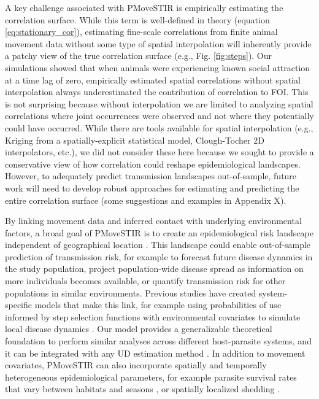 \documentclass[letterpaper]{article}
\begin{document}
A key challenge associated with PMoveSTIR is empirically estimating the correlation surface.  While this term is well-defined in theory (equation \ref{eq:stationary_cor}), estimating fine-scale correlations from finite animal movement data without some type of spatial interpolation will inherently provide a patchy view of the true correlation surface (e.g., Fig. \ref{fig:steps}).  Our simulations showed that when animals were experiencing known social attraction at a time lag of zero, empirically estimated spatial correlations without spatial interpolation always underestimated the contribution of correlation to FOI. This is not surprising because without interpolation we are limited to analyzing spatial correlations where joint occurrences were observed and not where they potentially could have occurred. While there are tools available for spatial interpolation (e.g., Kriging from a spatially-explicit statistical model, Clough-Tocher 2D interpolators, etc.), we did not consider these here because we sought to provide a conservative view of how correlation could reshape epidemiological landscapes.  However, to adequately predict transmission landscapes out-of-sample, future work will need to develop robust approaches for estimating and predicting the entire correlation surface (some suggestions and examples in Appendix X). 

By linking movement data and inferred contact with underlying environmental factors, a broad goal of PMoveSTIR is to create an epidemiological risk landscape independent of geographical location \citep{Manlove2022}. This landscape could enable out-of-sample prediction of transmission risk, for example to forecast future disease dynamics in the study population, project population-wide disease spread as information on more individuals becomes available, or quantify transmission risk for other populations in similar environments. Previous studies have created system-specific models that make this link, for example using probabilities of use informed by step selection functions with environmental covariates to simulate local disease dynamics \citep{Merkle2018}. Our model provides a generalizable theoretical foundation to perform similar analyses across different host-parasite systems, and it can be integrated with any UD estimation method \citep{Signer2017,Merkle2018,Michelot2020,Potts2023}. In addition to movement covariates, PMoveSTIR can also incorporate spatially and temporally heterogeneous epidemiological parameters, for example parasite survival rates that vary between habitats and seasons \citep{Daversa2017}, or spatially localized shedding \citep{Weinstein2018a}. 
\end{document}
